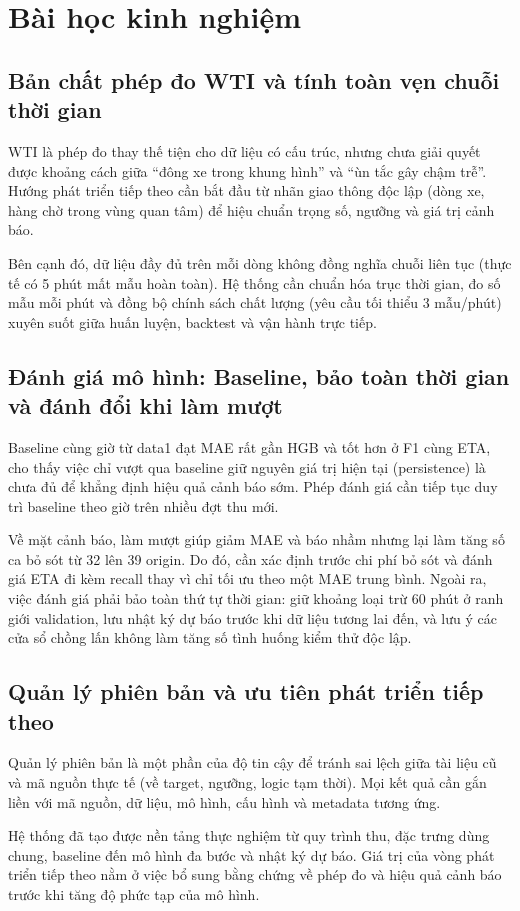 \section{Bài học kinh nghiệm}

\subsection{Bản chất phép đo WTI và tính toàn vẹn chuỗi thời gian}
WTI là phép đo thay thế tiện cho dữ liệu có cấu trúc, nhưng chưa giải quyết được khoảng cách giữa ``đông xe trong khung hình'' và ``ùn tắc gây chậm trễ''. Hướng phát triển tiếp theo cần bắt đầu từ nhãn giao thông độc lập (dòng xe, hàng chờ trong vùng quan tâm) để hiệu chuẩn trọng số, ngưỡng và giá trị cảnh báo.

Bên cạnh đó, dữ liệu đầy đủ trên mỗi dòng không đồng nghĩa chuỗi liên tục (thực tế có 5 phút mất mẫu hoàn toàn). Hệ thống cần chuẩn hóa trục thời gian, đo số mẫu mỗi phút và đồng bộ chính sách chất lượng (yêu cầu tối thiểu 3 mẫu/phút) xuyên suốt giữa huấn luyện, backtest và vận hành trực tiếp.

\subsection{Đánh giá mô hình: Baseline, bảo toàn thời gian và đánh đổi khi làm mượt}
Baseline cùng giờ từ data1 đạt MAE rất gần HGB và tốt hơn ở F1 cùng ETA, cho thấy việc chỉ vượt qua baseline giữ nguyên giá trị hiện tại (persistence) là chưa đủ để khẳng định hiệu quả cảnh báo sớm. Phép đánh giá cần tiếp tục duy trì baseline theo giờ trên nhiều đợt thu mới.

Về mặt cảnh báo, làm mượt giúp giảm MAE và báo nhầm nhưng lại làm tăng số ca bỏ sót từ 32 lên 39 origin. Do đó, cần xác định trước chi phí bỏ sót và đánh giá ETA đi kèm recall thay vì chỉ tối ưu theo một MAE trung bình. Ngoài ra, việc đánh giá phải bảo toàn thứ tự thời gian: giữ khoảng loại trừ 60 phút ở ranh giới validation, lưu nhật ký dự báo trước khi dữ liệu tương lai đến, và lưu ý các cửa sổ chồng lấn không làm tăng số tình huống kiểm thử độc lập.

\subsection{Quản lý phiên bản và ưu tiên phát triển tiếp theo}
Quản lý phiên bản là một phần của độ tin cậy để tránh sai lệch giữa tài liệu cũ và mã nguồn thực tế (về target, ngưỡng, logic tạm thời). Mọi kết quả cần gắn liền với mã nguồn, dữ liệu, mô hình, cấu hình và metadata tương ứng.



Hệ thống đã tạo được nền tảng thực nghiệm từ quy trình thu, đặc trưng dùng chung, baseline đến mô hình đa bước và nhật ký dự báo. Giá trị của vòng phát triển tiếp theo nằm ở việc bổ sung bằng chứng về phép đo và hiệu quả cảnh báo trước khi tăng độ phức tạp của mô hình.